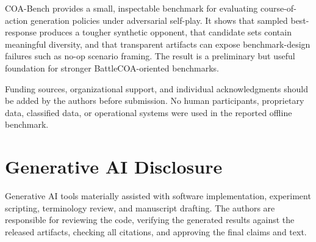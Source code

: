 \documentclass[sigconf]{acmart}
\begin{document}
COA-Bench provides a small, inspectable benchmark for evaluating course-of-action generation policies under adversarial self-play. It shows that sampled best-response produces a tougher synthetic opponent, that candidate sets contain meaningful diversity, and that transparent artifacts can expose benchmark-design failures such as no-op scenario framing. The result is a preliminary but useful foundation for stronger BattleCOA-oriented benchmarks.

\begin{acks}
Funding sources, organizational support, and individual acknowledgments should be added by the authors before submission. No human participants, proprietary data, classified data, or operational systems were used in the reported offline benchmark.
\end{acks}

\section*{Generative AI Disclosure}
Generative AI tools materially assisted with software implementation, experiment scripting, terminology review, and manuscript drafting. The authors are responsible for reviewing the code, verifying the generated results against the released artifacts, checking all citations, and approving the final claims and text.



\end{document}
